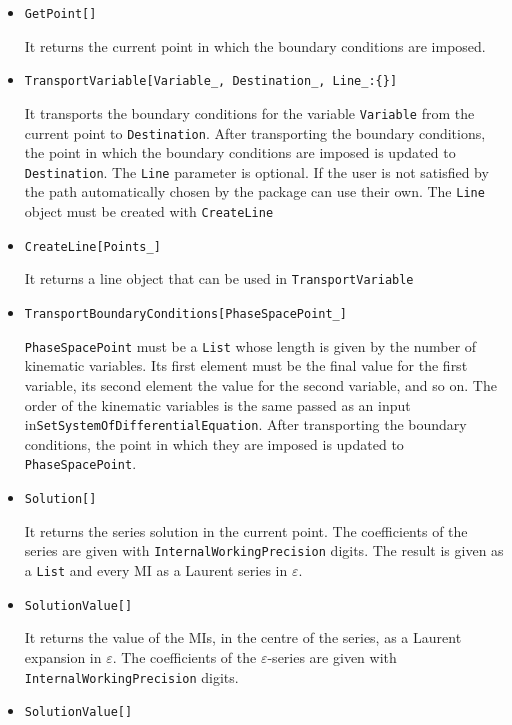 \documentclass[final,1p,times]{elsarticle}
\begin{document}
\begin{itemize}
    \item \texttt{GetPoint[]}
    
    It returns the current point in which the boundary conditions are imposed.
    
    \item \texttt{TransportVariable[Variable\_, Destination\_, Line\_:\{\}]}
    
    It transports the boundary conditions for the variable \texttt{Variable} from the current point to \texttt{Destination}. After transporting the boundary conditions, the point in which the boundary conditions are imposed is updated to \texttt{Destination}. The \texttt{Line} parameter is optional. If the user is not satisfied by the path automatically chosen by the package can use their own. The \texttt{Line} object must be created with \texttt{CreateLine}
    
    \item \texttt{CreateLine[Points\_]}
    
    It returns a line object that can be used in \texttt{TransportVariable}
    
    \item \texttt{TransportBoundaryConditions[PhaseSpacePoint\_]}
    
    \texttt{PhaseSpacePoint} must be a \texttt{List} whose length is given by the number of kinematic variables. Its first element must be the final value for the first variable, its second element the value for the second variable, and so on. The order of the kinematic variables is the same passed as an input in\texttt{SetSystemOfDifferentialEquation}. After transporting the boundary conditions, the point in which they are imposed is updated to \texttt{PhaseSpacePoint}.
    
    \item \texttt{Solution[]}
    
    It returns the series solution in the current point. The coefficients of the series are given with \texttt{InternalWorkingPrecision} digits. The result is given as a \texttt{List} and every MI as a Laurent series in $\varepsilon$.
    
    \item \texttt{SolutionValue[]}
    
    It returns the value of the MIs, in the centre of the series, as a Laurent expansion in $\varepsilon$. The coefficients of the $\varepsilon$-series are given with \texttt{InternalWorkingPrecision} digits.
    
    \item \texttt{SolutionValue[]}
    

\end{itemize}
\end{document}
